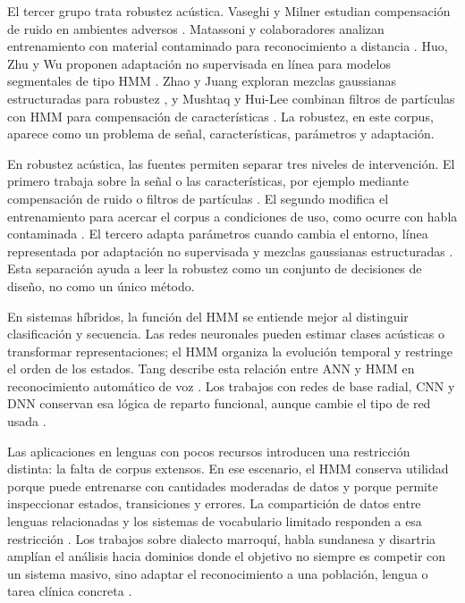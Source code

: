 El tercer grupo trata robustez acústica. Vaseghi y Milner estudian compensación de ruido en ambientes adversos \cite{Vaseghi1997NoiseCompen}. Matassoni y colaboradores analizan entrenamiento con material contaminado para reconocimiento a distancia \cite{Matassoni2002HiddenMarkov}. Huo, Zhu y Wu proponen adaptación no supervisada en línea para modelos segmentales de tipo HMM \cite{QiangHuo2006UnsupeOnline}. Zhao y Juang exploran mezclas gaussianas estructuradas para robustez \cite{Zhao2012StrandGaussi}, y Mushtaq y Hui-Lee combinan filtros de partículas con HMM para compensación de características \cite{Mushtaq2012IntegrApproa}. La robustez, en este corpus, aparece como un problema de señal, características, parámetros y adaptación.

En robustez acústica, las fuentes permiten separar tres niveles de intervención. El primero trabaja sobre la señal o las características, por ejemplo mediante compensación de ruido o filtros de partículas \cite{Vaseghi1997NoiseCompen,Mushtaq2012IntegrApproa}. El segundo modifica el entrenamiento para acercar el corpus a condiciones de uso, como ocurre con habla contaminada \cite{Matassoni2002HiddenMarkov}. El tercero adapta parámetros cuando cambia el entorno, línea representada por adaptación no supervisada y mezclas gaussianas estructuradas \cite{QiangHuo2006UnsupeOnline,Zhao2012StrandGaussi}. Esta separación ayuda a leer la robustez como un conjunto de decisiones de diseño, no como un único método.

En sistemas híbridos, la función del HMM se entiende mejor al distinguir clasificación y secuencia. Las redes neuronales pueden estimar clases acústicas o transformar representaciones; el HMM organiza la evolución temporal y restringe el orden de los estados. Tang describe esta relación entre ANN y HMM en reconocimiento automático de voz \cite{Tang2009HybridHidden}. Los trabajos con redes de base radial, CNN y DNN conservan esa lógica de reparto funcional, aunque cambie el tipo de red usada \cite{Justin2013HybridSpeech,Chen2020ResearImprov,Shanthamallappa2026DeepNeural}.

Las aplicaciones en lenguas con pocos recursos introducen una restricción distinta: la falta de corpus extensos. En ese escenario, el HMM conserva utilidad porque puede entrenarse con cantidades moderadas de datos y porque permite inspeccionar estados, transiciones y errores. La compartición de datos entre lenguas relacionadas y los sistemas de vocabulario limitado responden a esa restricción \cite{DeWet2017SpeechRecogn,Alume2004LimiteVocabu}. Los trabajos sobre dialecto marroquí, habla sundanesa y disartria amplían el análisis hacia dominios donde el objetivo no siempre es competir con un sistema masivo, sino adaptar el reconocimiento a una población, lengua o tarea clínica concreta \cite{Mouaz2019SpeechRecogn,Yulita2018FeaturExtrac,Lee2019AssessDysart}.

